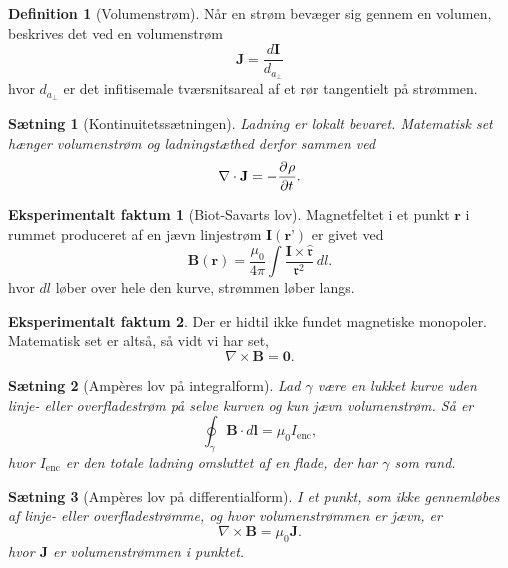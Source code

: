 \documentclass[]{article}
\newcommand{\fr}{\mathfrak{r}}
\newcommand{\hfr}{\hat{\mathfrak{r}}}
\newtheorem{theorem}{Sætning}
\theoremstyle{definition}
\newtheorem{definition}{Definition}
\newtheorem{experimental}{Eksperimentalt faktum}
\newcommand{\Ienc}{I_\text{enc}}
\begin{document}
\begin{definition}[Volumenstrøm]
	Når en strøm bevæger sig gennem en volumen, beskrives det ved en volumenstrøm
	\begin{equation*}
		\mathbf{J} = \dfrac{d\mathbf{I}}{d_{a_\perp}}
	\end{equation*}
	hvor $d_{a_\perp}$ er det infitisemale tværsnitsareal af et rør tangentielt på strømmen.
\end{definition}

\begin{theorem}[Kontinuitetssætningen]
	Ladning er lokalt bevaret. Matematisk set hænger volumenstrøm og ladningstæthed derfor sammen ved
	\begin{equation*}
		\nabla \cdot \mathbf{J} = -\frac{\partial^{} \rho}{\partial t ^{}}.
	\end{equation*}
\end{theorem}

\begin{experimental}[Biot-Savarts lov]
	Magnetfeltet i et punkt $\mathbf{r}$ i rummet produceret af en jævn linjestrøm $\mathbf{I}(\textbf{r'})$ er givet ved
	\begin{equation*}
		\mathbf{B}(\mathbf{r}) = \frac{\mu_0}{4 \pi} \int{\frac{\mathbf{I} \times \hfr}{\fr^2}} \ dl.
	\end{equation*}
	hvor $dl$ løber over hele den kurve, strømmen løber langs.
\end{experimental}

\begin{experimental}
	Der er hidtil ikke fundet magnetiske monopoler. Matematisk set er altså, så vidt vi har set,
	\begin{equation*}
		\nabla \times \mathbf{B} = \mathbf{0}.
	\end{equation*}
\end{experimental}

\begin{theorem}[Ampères lov på integralform]
	Lad $\gamma$ være en lukket kurve uden linje- eller overfladestrøm på selve kurven og kun jævn volumenstrøm. Så er
	\begin{equation*}
		\oint_\gamma \mathbf{B} \cdot d \mathbf{l} = \mu_0 \Ienc, 
	\end{equation*}
	hvor $\Ienc$ er den totale ladning omsluttet af en flade, der har $\gamma$ som rand.
\end{theorem}

\begin{theorem}[Ampères lov på differentialform]
	I et punkt, som ikke gennemløbes af linje- eller overfladestrømme, og hvor volumenstrømmen er jævn, er 
	\begin{equation*}
		\nabla \times \mathbf{B} = \mu_0 \mathbf{J}.
	\end{equation*}
	hvor $\mathbf{J}$ er volumenstrømmen i punktet.
\end{theorem}
\end{document}
